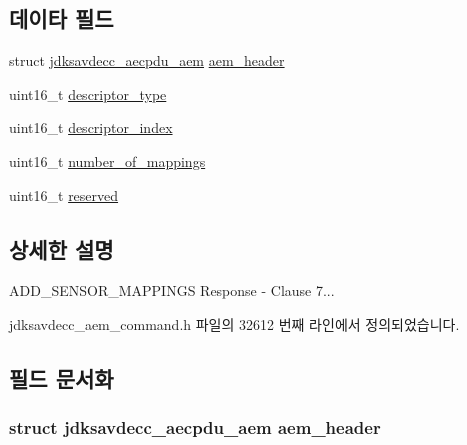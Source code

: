 \subsection*{데이타 필드}
\begin{DoxyCompactItemize}
\item 
struct \hyperlink{structjdksavdecc__aecpdu__aem}{jdksavdecc\+\_\+aecpdu\+\_\+aem} \hyperlink{structjdksavdecc__aem__command__add__sensor__mappings__response_ae1e77ccb75ff5021ad923221eab38294}{aem\+\_\+header}
\item 
uint16\+\_\+t \hyperlink{structjdksavdecc__aem__command__add__sensor__mappings__response_ab7c32b6c7131c13d4ea3b7ee2f09b78d}{descriptor\+\_\+type}
\item 
uint16\+\_\+t \hyperlink{structjdksavdecc__aem__command__add__sensor__mappings__response_a042bbc76d835b82d27c1932431ee38d4}{descriptor\+\_\+index}
\item 
uint16\+\_\+t \hyperlink{structjdksavdecc__aem__command__add__sensor__mappings__response_ac7db472c5622ef473d5d0a5c416d5531}{number\+\_\+of\+\_\+mappings}
\item 
uint16\+\_\+t \hyperlink{structjdksavdecc__aem__command__add__sensor__mappings__response_a5a6ed8c04a3db86066924b1a1bf4dad3}{reserved}
\end{DoxyCompactItemize}


\subsection{상세한 설명}
A\+D\+D\+\_\+\+S\+E\+N\+S\+O\+R\+\_\+\+M\+A\+P\+P\+I\+N\+GS Response -\/ Clause 7... 

jdksavdecc\+\_\+aem\+\_\+command.\+h 파일의 32612 번째 라인에서 정의되었습니다.



\subsection{필드 문서화}
\subsubsection[{\texorpdfstring{aem\+\_\+header}{aem_header}}]{\setlength{\rightskip}{0pt plus 5cm}struct {\bf jdksavdecc\+\_\+aecpdu\+\_\+aem} aem\+\_\+header}\hypertarget{structjdksavdecc__aem__command__add__sensor__mappings__response_ae1e77ccb75ff5021ad923221eab38294}{}\label{structjdksavdecc__aem__command__add__sensor__mappings__response_ae1e77ccb75ff5021ad923221eab38294}


